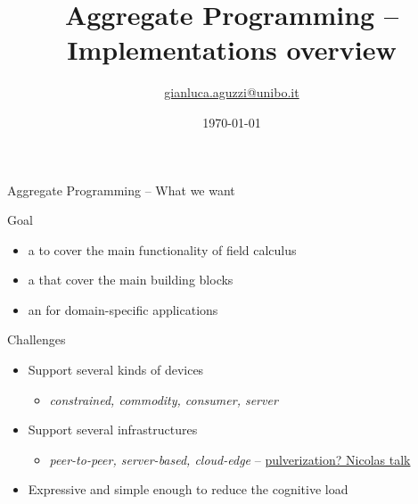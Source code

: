 \documentclass[presentation, 9pt]{beamer}\mode<presentation>{\usetheme{AMSBolognaFC}}
\title[AP -- Implementations overview]
{Aggregate Programming -- Implementations overview}
\author[\sspeaker{Aguzzi}]
{\speaker{Gianluca Aguzzi} \href{mailto:gianluca.aguzzi@unibo.it}{gianluca.aguzzi@unibo.it} }
\institute[DISI, Univ.\ Bologna]
{%
\textsc{Alma Mater Studiorum} -- Universit{\`a} di Bologna \\[0.1cm]
}
\date[\today]{\today}
\begin{document}

\frame{\titlepage}
\begin{frame}{Aggregate Programming -- What we want}
	\begin{exampleblock}{Goal}
		\begin{itemize}
			\item a  to cover the main functionality of field calculus
			\item a  that cover the main building blocks
			\item an  for domain-specific applications
		\end{itemize}
	\end{exampleblock}
	\begin{exampleblock}{Challenges}
		\begin{itemize}
			\item Support several kinds of devices
			\begin{itemize}
				\item \emph{constrained, commodity, consumer, server}
			\end{itemize}
			\item Support several infrastructures
			\begin{itemize}
				\item \emph{peer-to-peer, server-based, cloud-edge} -- \underline{pulverization? Nicolas talk}
			\end{itemize}
			\item Expressive and simple enough to reduce the cognitive load
		\end{itemize}
	\end{exampleblock}
\end{frame}
\end{document}
